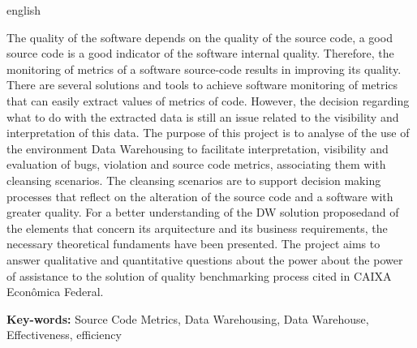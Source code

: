 \begin{resumo}[Abstract]
 \begin{otherlanguage*}{english}
 
The quality of the software depends on the quality of the source code, a good source code is a good indicator of the software internal quality. Therefore, the monitoring of metrics of a software source-code results in improving its quality. There are several solutions and tools to achieve software monitoring of metrics that can easily extract values of metrics of code. However, the decision regarding what to do with the extracted data is still an issue related to the visibility and interpretation of this data. The purpose of this project is to analyse of the use of the environment Data Warehousing to facilitate interpretation, visibility and evaluation of bugs, violation and source code metrics, associating them with cleansing scenarios. The cleansing scenarios are to support decision making processes that reflect on the alteration of the source code and a software with greater quality. For a better understanding of the DW solution proposedand of the elements that concern its arquitecture and its business requirements, the necessary theoretical fundaments have been presented. The project aims to answer qualitative and quantitative questions about the power about the power of
assistance to the solution of quality benchmarking process cited in CAIXA Econômica Federal.
 
\textbf{Key-words:} Source Code Metrics,  Data Warehousing, Data Warehouse, Effectiveness, 	 efficiency

 \end{otherlanguage*}
\end{resumo}
